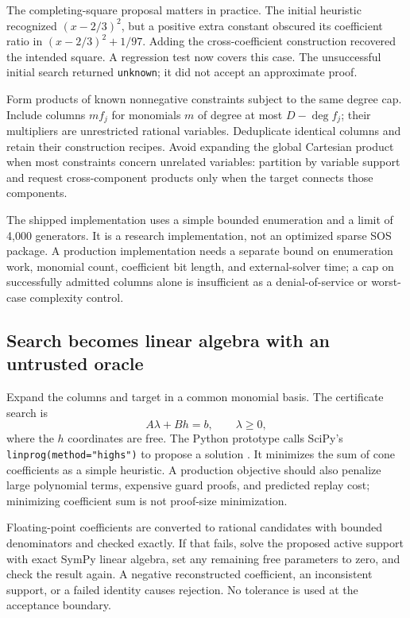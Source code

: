 \documentclass[11pt,a4paper]{article}
\newcommand{\code}[1]{\texttt{\small #1}}
\begin{document}
The completing-square proposal matters in practice. The initial heuristic
recognized $(x-2/3)^2$, but a positive extra constant obscured its coefficient
ratio in $(x-2/3)^2+1/97$. Adding the cross-coefficient construction recovered
the intended square. A regression test now covers this case. The unsuccessful
initial search returned \code{unknown}; it did not accept an approximate proof.

Form products of known nonnegative constraints subject to the same degree cap.
Include columns $m f_j$ for monomials $m$ of degree at most $D-\deg f_j$; their
multipliers are unrestricted rational variables. Deduplicate identical columns
and retain their construction recipes. Avoid expanding the global Cartesian
product when most constraints concern unrelated variables: partition by
variable support and request cross-component products only when the target
connects those components.

The shipped implementation uses a simple bounded enumeration and a limit of
4,000 generators. It is a research implementation, not an optimized sparse
SOS package. A production implementation needs a separate bound on enumeration
work, monomial count, coefficient bit length, and external-solver time; a cap
on successfully admitted columns alone is insufficient as a denial-of-service
or worst-case complexity control.

\subsection{Search becomes linear algebra with an untrusted oracle}

Expand the columns and target in a common monomial basis. The certificate
search is
\begin{equation}\label{eq:lp}
 A\lambda+Bh=b,\qquad \lambda\geq0,
\end{equation}
where the $h$ coordinates are free. The Python prototype calls SciPy's
\code{linprog(method="highs")} to propose a solution \cite{scipy-lp}.
It minimizes the sum of cone coefficients as a simple heuristic. A production
objective should also penalize large polynomial terms, expensive guard proofs,
and predicted replay cost; minimizing coefficient sum is not proof-size
minimization.

Floating-point coefficients are converted to rational candidates with bounded
denominators and checked exactly. If that fails, solve the proposed active
support with exact SymPy linear algebra, set any remaining free parameters to
zero, and check the result again. A negative reconstructed coefficient, an
inconsistent support, or a failed identity causes rejection. No tolerance is
used at the acceptance boundary.
\end{document}

